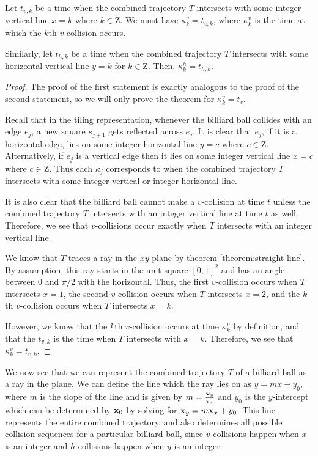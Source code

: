 \begin{theorem}
  Let $t_{v, k}$ be a time when the combined trajectory $T$ intersects with some integer vertical line $x = k$ where $k \in \mathrm{Z}$. We must have $\kappa^v_k = t_{v, k}$, where $\kappa^v_k$ is the time at which the $k$th $v$-collision occurs.

  Similarly, let $t_{h, k}$ be a time when the combined trajectory $T$ intersects with some horizontal vertical line $y = k$ for $k \in \mathrm{Z}$. Then, $\kappa^h_k = t_{h, k}$.
\end{theorem}
\begin{proof}
  The proof of the first statement is exactly analogous to the proof of the second statement, so we will only prove the theorem for $\kappa^v_k = t_v$.

  Recall that in the tiling representation, whenever the billiard ball collides with an edge $e_j$, a new square $s_{j+1}$ gets reflected across $e_j$. It is clear that $e_j$, if it is a horizontal edge, lies on some integer horizontal line $y = c$ where $c \in \mathrm{Z}$. Alternatively, if $e_j$ is a vertical edge then it lies on some integer vertical line $x = c$ where $c \in \mathrm{Z}$. Thus each $\kappa_j$ corresponds to when the combined trajectory $T$ intersects with some integer vertical or integer horizontal line.

  It is also clear that the billiard ball cannot make a $v$-collision at time $t$ unless the combined trajectory $T$ intersects with an integer vertical line at time $t$ as well. Therefore, we see that $v$-collisions occur exactly when $T$ intersects with an integer vertical line.

  We know that $T$ traces a ray in the $xy$ plane by theorem \ref{theorem:straight-line}. By assumption, this ray starts in the unit square $[0,1]^2$ and has an angle between $0$ and $\pi/2$ with the horizontal. Thus, the first $v$-collision occurs when $T$ intersects $x = 1$, the second $v$-collision occurs when $T$ intersects $x = 2$, and the $k$th $v$-collision occurs when $T$ intersects $x = k$.

  However, we know that the $k$th $v$-collision occurs at time $\kappa^v_{k}$ by definition, and that the $t_{v, k}$ is the time when $T$ intersects with $x = k$. Therefore, we see that $\kappa^v_{k} = t_{v, k}$.
\end{proof}

We now see that we can represent the combined trajectory $T$ of a billiard ball as a ray in the plane. We can define the line which the ray lies on as $y = mx + y_0$, where $m$ is the slope of the line and is given by $m = \frac{\mathbf{v}_y}{\mathbf{v}_x}$ and $y_0$ is the $y$-intercept which can be determined by $\mathbf{x}_0$ by solving for $\mathbf{x}_y = m \mathbf{x}_x + y_0$. This line represents the entire combined trajectory, and also determines all possible collision sequences for a particular billiard ball, since $v$-collisions happen when $x$ is an integer and $h$-collisions happen when $y$ is an integer.
